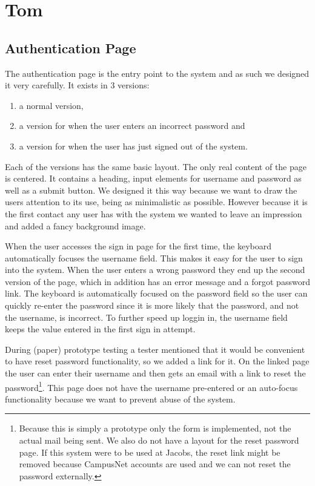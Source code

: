 \section{Tom}

\subsection{Authentication Page}

The authentication page is the entry point to the system and as such we designed it very carefully. It exists in 3 versions:

\begin{enumerate}
  \item a normal version,
  \item a version for when the user enters an incorrect password and
  \item a version for when the user has just signed out of the system.
\end{enumerate}

Each of the versions has the same basic layout. The only real content of the page is centered. It contains a heading, input elements for username and password as well as a submit button. We designed it this way because we want to draw the users attention to its use, being as minimalistic as possible. However because it is the first contact any user has with the system we wanted to leave an impression and added a fancy background image.

When the user accesses the sign in page for the first time, the keyboard automatically focuses the username field. This makes it easy for the user to sign into the system. When the user enters a wrong password they end up the second version of the page, which in addition has an error message and a forgot password link. The keyboard is automatically focused on the password field so the user can quickly re-enter the password since it is more likely that the password, and not the username, is incorrect. To further speed up loggin in, the username field keeps the value entered in the first sign in attempt.

During (paper) prototype testing a tester mentioned that it would be convenient to have reset password functionality, so we added a link for it.  On the linked page the user can enter their username and then gets an email with a link to reset the password\footnote{Because this is simply a prototype only the form is implemented, not the actual mail being sent. We also do not have a layout for the reset password page. If this system were to be used at Jacobs, the reset link might be removed because CampusNet accounts are used and we can not reset the password externally. }. This page does not have the username pre-entered or an auto-focus functionality because we want to prevent abuse of the system.

